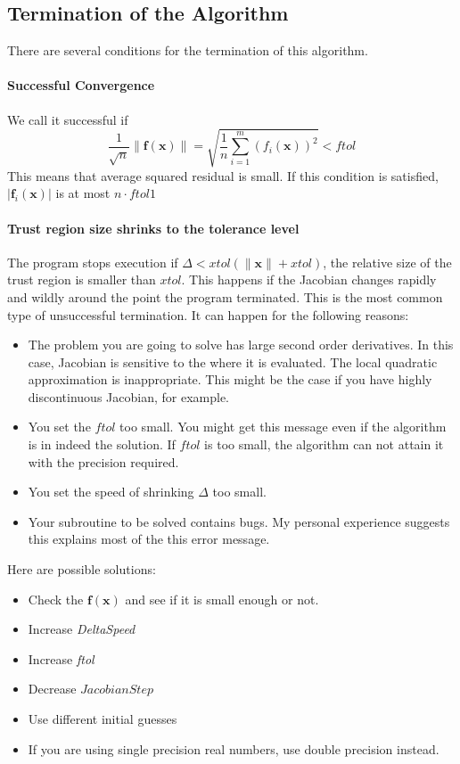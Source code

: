 \documentclass[12pt]{article}
\def\xb{{\mathbf{x}}}
\def\fb{{\mathbf{f}}}
\begin{document}
\subsection{Termination of the Algorithm}
There are several conditions for the termination of this algorithm.

\paragraph{Successful Convergence}
 We call it successful if 
\[
\frac{1}{\sqrt{n}}\|\fb(\xb)\|=\sqrt{\frac{1}{n}\sum_{i=1}^m(f_i(\xb))^2} < ftol
\]
This means that average squared residual is small. If this condition is satisfied, $|\fb_i(\xb)|$
is at most $n\cdot ftol1$

\paragraph{Trust region size shrinks to the tolerance level}
The program stops execution if $\Delta < xtol(\|\xb\|+xtol)$, the relative size of the trust
region is smaller than $xtol$. This happens if the Jacobian changes rapidly and wildly around the
point the program terminated. This is the most common type of unsuccessful termination. It can
happen for the following reasons: 
\begin{itemize}
\item The problem you are going to solve has large second order derivatives. In this case,
  Jacobian is sensitive to the where it is evaluated. The local quadratic approximation is
  inappropriate. This might be the case if you have highly discontinuous Jacobian, for example.
\item You set the $ftol$ too small. You might get this message even if the algorithm is in indeed
  the solution. If $ftol$ is too small, the algorithm can not attain it with the precision
  required.
\item You set the speed of shrinking $\Delta$ too small. 
\item Your subroutine to be solved contains bugs. My personal experience suggests this explains
  most of the this error message. 
\end{itemize} 

Here are possible solutions:
\begin{itemize}
\item Check the $\fb(\xb)$ and see if it is small enough or not. 
\item Increase \textit{DeltaSpeed}
\item Increase \textit{ftol}
\item Decrease $JacobianStep$
\item Use different initial guesses
\item If you are using single precision real numbers, use double precision instead. 
\end{itemize}
\end{document}
